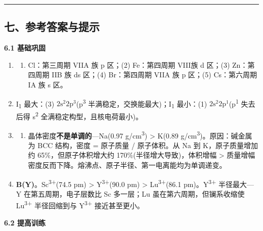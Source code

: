 \begin{center}\rule{0.5\linewidth}{0.5pt}\end{center}

\subsection{七、参考答案与提示}\label{ux4e03ux53c2ux8003ux7b54ux6848ux4e0eux63d0ux793a}

\textbf{6.1 基础巩固}

\begin{enumerate}
\def\labelenumi{\arabic{enumi}.}
\item
  \begin{enumerate}
  \def\labelenumii{(\arabic{enumii})}
  \tightlist
  \item
    Cl：第三周期 VIIA 族 p 区；(2) Fe：第四周期 VIII族 d 区；(3) Zn：第四周期 IIB 族 ds 区；(4) Br：第四周期 VIIA 族 p 区；(5) Cs：第六周期 IA 族 s 区。
  \end{enumerate}
\item
  I\textsubscript{1} 最大：(3) \(2\mathrm{s}^2 2\mathrm{p}^3\)(p\textsuperscript{3} 半满稳定，交换能最大)；I\textsubscript{1} 最小：(1) \(2\mathrm{s}^2 2\mathrm{p}^1\)(p\textsuperscript{1} 失去后得 s\textsuperscript{2} 全满稳定构型，且核电荷最小)。
\item
  \begin{enumerate}
  \def\labelenumii{(\alph{enumii})}
  \setcounter{enumii}{2}
  \tightlist
  \item
    晶体密度\textbf{不是单调的}---Na(0.97 g/cm\textsuperscript{3}) \textgreater{} K(0.89 g/cm\textsuperscript{3})。原因：碱金属为 BCC 结构，密度 = 原子质量 / 原子体积。从 Na 到 K，原子质量增加约 65\%，但原子体积增大约 170\%(半径增大导致)，体积增幅 \textgreater{} 质量增幅 \箭 密度反而下降。熔沸点、原子半径、第一电离能均为单调递变。
  \end{enumerate}
\item
  \textbf{B(Y)}。Sc\textsuperscript{3+}(74.5 pm) \textgreater{} Y\textsuperscript{3+}(90.0 pm) \textgreater{} Lu\textsuperscript{3+}(86.1 pm)。Y\textsuperscript{3+} 半径最大---Y 在第五周期，电子层数比 Sc 多一层；Lu 虽在第六周期，但镧系收缩使 Lu\textsuperscript{3+} 半径回缩到与 Y\textsuperscript{3+} 接近甚至更小。
\end{enumerate}

\textbf{6.2 提高训练}

